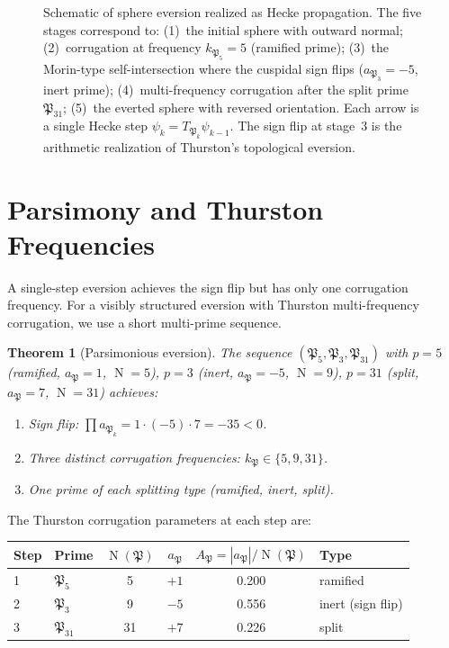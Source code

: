 \documentclass[11pt,a4paper]{article}
\theoremstyle{plain}
\newtheorem{theorem}{Theorem}[section]
\theoremstyle{definition}
\theoremstyle{remark}
\numberwithin{equation}{section}
\providecommand{\fP}{\mathfrak{P}}
\DeclareMathOperator{\Nm}{N}
\begin{document}
\begin{figure}[ht]
\caption{Schematic of sphere eversion realized as Hecke propagation.
The five stages correspond to: (1)~the initial sphere with outward
normal; (2)~corrugation at frequency $k_{\fP_5}=5$ (ramified prime);
(3)~the Morin-type self-intersection where the cuspidal sign flips
($a_{\fP_3}=-5$, inert prime); (4)~multi-frequency corrugation after
the split prime $\fP_{31}$; (5)~the everted sphere with reversed
orientation.  Each arrow is a single Hecke step
$\psi_k = T_{\fP_k}\psi_{k-1}$.  The sign flip at stage~3 is the
arithmetic realization of Thurston's topological eversion.}
\label{fig:eversion-schematic}
\end{figure}


\section{Parsimony and Thurston Frequencies}\label{sec:parsimony}

A single-step eversion achieves the sign flip but has only one corrugation
frequency.  For a visibly structured eversion with Thurston multi-frequency
corrugation, we use a short multi-prime sequence.

\begin{theorem}[Parsimonious eversion]\label{thm:parsimony}
The sequence $(\fP_5, \fP_3, \fP_{31})$ with $p = 5$ (ramified,
$a_\fP = 1$, $\Nm = 5$), $p = 3$ (inert, $a_\fP = -5$, $\Nm = 9$),
$p = 31$ (split, $a_\fP = 7$, $\Nm = 31$) achieves:
\begin{enumerate}[label=(\roman*)]
\item Sign flip: $\prod a_{\fP_k} = 1 \cdot (-5) \cdot 7 = -35 < 0$.
\item Three distinct corrugation frequencies: $k_\fP \in \{5, 9, 31\}$.
\item One prime of each splitting type (ramified, inert, split).
\end{enumerate}
\end{theorem}

The Thurston corrugation parameters at each step are:
\begin{center}
\begin{tabular}{llcccl}
\toprule
Step & Prime & $\Nm(\fP)$ & $a_\fP$ & $A_\fP = |a_\fP|/\Nm(\fP)$ & Type \\
\midrule
1 & $\fP_5$  & 5  & $+1$  & 0.200 & ramified \\
2 & $\fP_3$  & 9  & $-5$  & 0.556 & inert (sign flip) \\
3 & $\fP_{31}$ & 31 & $+7$ & 0.226 & split \\
\bottomrule
\end{tabular}
\end{center}
\end{document}
